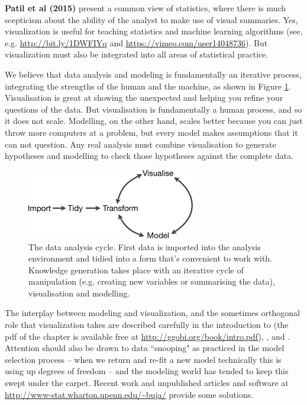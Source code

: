 \documentclass[preprint]{imsart}
\begin{document}

\textbf{Patil et al (2015)} present a common view of statistics, where there is much scepticism about the ability of the analyst to make use of visual summaries. Yes, visualization is useful for teaching statistics and machine learning algorithms (see, e.g. \url{http://bit.ly/1DWFIYq} and \url{https://vimeo.com/user14048736}). But visualization must also be integrated into all areas of statistical practice.

We believe that data analysis and modeling is fundamentally an iterative process, integrating the strengths of the human and the machine, as shown in Figure \ref{fig:cycle}. Visualisation is great at showing the unexpected and helping you refine your questions of the data. But visualisation is fundamentally a human process, and so it does not scale. Modelling, on the other hand, scales better because you can just throw more computers at a problem, but every model makes assumptions that it can not question. Any real analysis must combine visualisation to generate hypotheses and modelling to check those hypotheses against the complete data.

\begin{figure}[htbp]
  \centering
  \includegraphics[height=1.2in]{cycle-crop}
  \caption{The data analysis cycle. First data is imported into the analysis environment and tidied into a form that's convenient to work with. Knowledge generation takes place with an iterative cycle of manipulation (e.g. creating new variables or summarising the data), visualisation and modelling.}
  \label{fig:cycle}
\end{figure}

The interplay between modeling and visualization, and the sometimes orthogonal role that visualization takes are described carefully in the introduction to \cite{cook:2007} (the pdf of the chapter is available free at \url{http://ggobi.org/book/intro.pdf}), \cite{Ch95}, and \cite{CH90}. Attention should also be drawn to data ``snooping" as practiced in the model selection process -- when we return and re-fit a new model technically this is using up degrees of freedom -- and the modeling world has tended to keep this swept under the carpet. Recent work \cite{berk:2013} and unpublished articles and software at \url{http://www-stat.wharton.upenn.edu/~buja/} provide some solutions.
\end{document}
